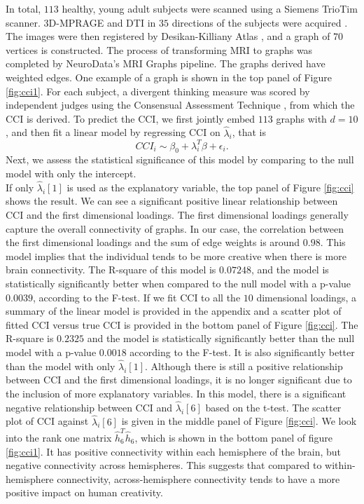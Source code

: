 \documentclass[10pt,journal,compsoc]{IEEEtran}
\begin{document}
\noindent In total, $113$ healthy, young adult subjects were scanned using a Siemens TrioTim scanner. 3D-MPRAGE and DTI in $35$ directions of the subjects were acquired \cite{brant1992mp}. The images were then registered by Desikan-Killiany Atlas \cite{desikan2006automated}, and a graph of $70$ vertices is constructed. The process of transforming MRI to graphs was completed by NeuroData's MRI Graphs pipeline\cite{kiar2016ndmgcode}. The graphs derived have weighted edges. One example of a graph is shown in the top panel of Figure \ref{fig:cci1}. For each subject, a divergent thinking measure was scored by independent judges using the Consensual Assessment Technique \cite{amabile1983social}, from which the CCI is derived. To predict the CCI, we first jointly embed $113$ graphs with $d=10$, and then fit a linear model by regressing CCI on $\hat{\lambda}_i$, that is
\[CCI_i \sim \beta_0+\lambda_i^T\beta + \epsilon_i. \]
Next, we assess the statistical significance of this model by comparing to the null model with only the intercept. \\

\noindent If only $\hat{\lambda}_i[1]$ is used as the explanatory variable, the top panel of Figure \ref{fig:cci} shows the result. We can see a significant positive linear relationship between CCI and the first dimensional loadings. The first dimensional loadings generally capture the overall connectivity of graphs. In our case, the correlation between the first dimensional loadings and the sum of edge weights is around $0.98$. This model implies that the individual tends to be more creative when there is more brain connectivity. The R-square of this model is $0.07248$, and the model is statistically significantly better when compared to the null model with a p-value $0.0039$, according to the F-test. If we fit CCI to all the $10$ dimensional loadings, a summary of the linear model is provided in the appendix and a scatter plot of fitted CCI versus true CCI is provided in the bottom panel of Figure \ref{fig:cci}. The R-square is $0.2325$ and the model is statistically significantly better than the null model with a p-value $0.0018$ according to the F-test. It is also significantly better than the model with only $\hat{\lambda}_i[1]$. Although there is still a positive relationship between CCI and the first dimensional loadings, it is no longer significant due to the inclusion of more explanatory variables. In this model, there is a significant negative relationship between CCI and $\hat{\lambda}_i[6]$ based on the t-test. The scatter plot of CCI against $\hat{\lambda}_i[6]$ is given in the middle panel of Figure \ref{fig:cci}. We look into the rank one matrix $\hat{h}_6^T\hat{h}_6$, which is shown in the bottom panel of figure \ref{fig:cci1}. It has positive connectivity within each hemisphere of the brain, but negative connectivity across hemispheres. This suggests that compared to within-hemisphere connectivity, across-hemisphere connectivity tends to have a more positive impact on human creativity. 
\end{document}
